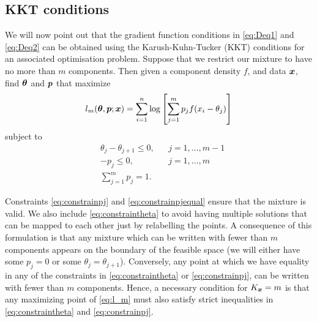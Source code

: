 	\subsection{KKT conditions}
	\label{sec:KKT conditions}
	We will now point out that the gradient function conditions in \eqref{eq:Deq1} and \eqref{eq:Deq2} can be obtained using the Karush-Kuhn-Tucker (KKT) conditions \cite{Kuhn1951-ih} \cite{Karush2014-vk} for an associated optimisation problem. Suppose that we restrict our mixture to have no more than $m$ components. Then given a component density $f$, and data ${\bm{{x}}}$, %
%
	find ${\bm{{\theta}}}$ and ${\bm{{p}}}$ that maximize
	\begin{equation}
		l_m({\bm{{\theta}}},{\bm{{p}}};{\bm{{x}}}) = \sum_{i=1}^n \log \left[\sum_{j=1}^m p_j f(x_i - \theta_j) \right]
		\label{eq:l_m}
	\end{equation}
	subject to 
	\begin{align}
		&\theta_j -\theta_{j+1} \leq 0, &&j=1,\dots,m-1
		\label{eq:constraintheta}\\
		&-p_j \leq 0, &&j=1,\dots,m
		\label{eq:constrainpj}\\
		&\sum_{j=1}^m p_j = 1.
		\label{eq:constrainpjequal}
	\end{align}

	Constraints \eqref{eq:constrainpj} and \eqref{eq:constrainpjequal} ensure that the mixture is valid. We also include \eqref{eq:constraintheta} to avoid having multiple solutions that can be mapped to each other just by relabelling the points. A consequence of this formulation is that any mixture which can be written with fewer than $m$ components appears on the boundary of the feasible space (we will either have some $p_j = 0$ or some $\theta_j = \theta_{j+1}$). Conversely, any point at which we have equality in any of the constraints in \eqref{eq:constraintheta} or \eqref{eq:constrainpj}, can be written with fewer than $m$ components. Hence, a necessary condition for $K_{\bm{{x}}} = m$ is that any maximizing point of \eqref{eq:l_m} must also satisfy strict inequalities in \eqref{eq:constraintheta} and \eqref{eq:constrainpj}.

